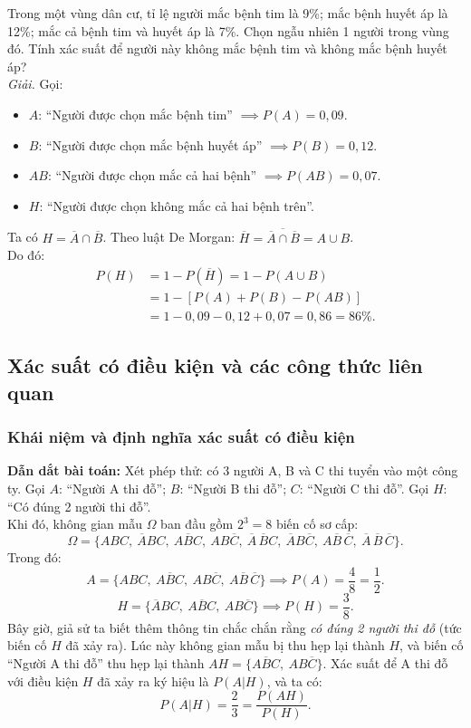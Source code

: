 \begin{vidu}
Trong một vùng dân cư, tỉ lệ người mắc bệnh tim là 9\%; mắc bệnh huyết áp là 12\%; mắc cả bệnh tim và huyết áp là 7\%. Chọn ngẫu nhiên 1 người trong vùng đó. Tính xác suất để người này không mắc bệnh tim và không mắc bệnh huyết áp?\\
\textit{Giải.} Gọi:
\begin{itemize}
    \item $A$: ``Người được chọn mắc bệnh tim'' $\implies P(A) = 0{,}09$.
    \item $B$: ``Người được chọn mắc bệnh huyết áp'' $\implies P(B) = 0{,}12$.
    \item $AB$: ``Người được chọn mắc cả hai bệnh'' $\implies P(AB) = 0{,}07$.
    \item $H$: ``Người được chọn không mắc cả hai bệnh trên''.
\end{itemize}
Ta có $H = \overline{A} \cap \overline{B}$. Theo luật De Morgan: $\overline{H} = \overline{\overline{A} \cap \overline{B}} = A \cup B$.\\
Do đó:
\begin{align*}
P(H) &= 1 - P(\overline{H}) = 1 - P(A \cup B) \\
     &= 1 - [P(A) + P(B) - P(AB)] \\
     &= 1 - 0{,}09 - 0{,}12 + 0{,}07 = 0{,}86 = 86\%.
\end{align*}
\end{vidu}

\subsection{Xác suất có điều kiện và các công thức liên quan}

\subsubsection{Khái niệm và định nghĩa xác suất có điều kiện}
\textbf{Dẫn dắt bài toán:} Xét phép thử: có 3 người A, B và C thi tuyển vào một công ty.
Gọi $A$: ``Người A thi đỗ''; $B$: ``Người B thi đỗ''; $C$: ``Người C thi đỗ''.
Gọi $H$: ``Có đúng 2 người thi đỗ''.\\
Khi đó, không gian mẫu $\Omega$ ban đầu gồm $2^3 = 8$ biến cố sơ cấp:
\[
\Omega = \{ABC,\ \overline{A}BC,\ A\overline{B}C,\ AB\overline{C},\ \overline{A}\,\overline{B}C,\ \overline{A}B\overline{C},\ A\overline{B}\,\overline{C},\ \overline{A}\,\overline{B}\,\overline{C}\}.
\]
Trong đó:
\[
A = \{ABC,\ A\overline{B}C,\ AB\overline{C},\ A\overline{B}\,\overline{C}\} \implies P(A) = \frac{4}{8} = \frac{1}{2}.
\]
\[
H = \{\overline{A}BC,\ A\overline{B}C,\ AB\overline{C}\} \implies P(H) = \frac{3}{8}.
\]
Bây giờ, giả sử ta biết thêm thông tin chắc chắn rằng \textit{có đúng 2 người thi đỗ} (tức biến cố $H$ đã xảy ra).
Lúc này không gian mẫu bị thu hẹp lại thành $H$, và biến cố ``Người A thi đỗ'' thu hẹp lại thành $AH = \{A\overline{B}C,\ AB\overline{C}\}$.
Xác suất để A thi đỗ với điều kiện $H$ đã xảy ra ký hiệu là $P(A|H)$, và ta có:
\[
P(A|H) = \frac{2}{3} = \frac{P(AH)}{P(H)}.
\]

